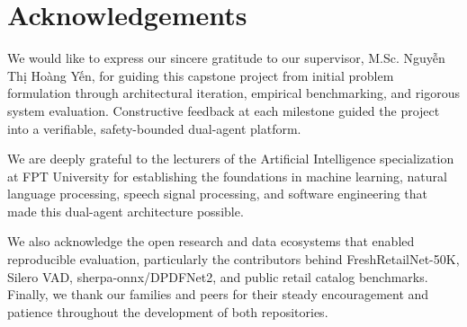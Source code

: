 \chapter*{Acknowledgements}

We would like to express our sincere gratitude to our supervisor, M.Sc. Nguyễn Thị Hoàng Yến, for guiding this capstone project from initial problem formulation through architectural iteration, empirical benchmarking, and rigorous system evaluation. Constructive feedback at each milestone guided the project into a verifiable, safety-bounded dual-agent platform.

We are deeply grateful to the lecturers of the Artificial Intelligence specialization at FPT University for establishing the foundations in machine learning, natural language processing, speech signal processing, and software engineering that made this dual-agent architecture possible.

We also acknowledge the open research and data ecosystems that enabled reproducible evaluation, particularly the contributors behind FreshRetailNet-50K, Silero VAD, sherpa-onnx/DPDFNet2, and public retail catalog benchmarks. Finally, we thank our families and peers for their steady encouragement and patience throughout the development of both repositories.
